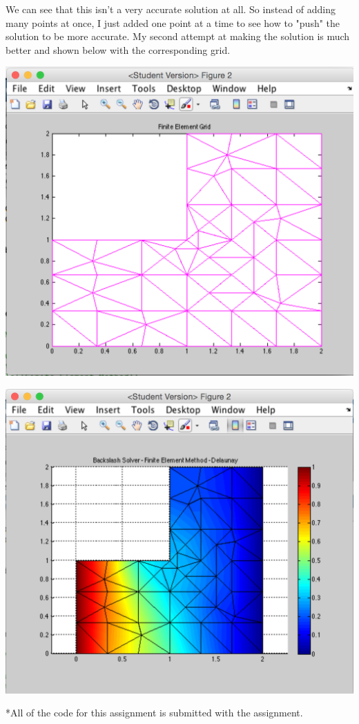 \documentclass[11pt, oneside]{article}   	%
\begin{document}
\vspace{5mm}

We can see that this isn't a very accurate solution at all. So instead of adding many points at once, I just added one point at a time to see how to "push" the solution to be more accurate. My second attempt at making the solution is much better and shown below with the corresponding grid. \\

\centerline{\includegraphics[scale = 0.55]{DelaunayAdjustGrid.png}}

\vspace{5mm}

\centerline{\includegraphics[scale = 0.55]{DelaunayAdjust.png}}

\vspace{5mm}

*All of the code for this assignment is submitted with the assignment.
\end{document}
